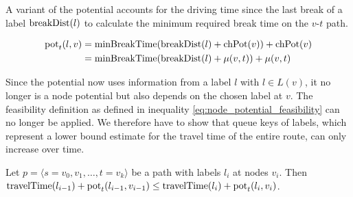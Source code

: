 A variant of the potential accounts for the driving time since the last break of a label $\operatorname{breakDist}(l)$ to calculate the minimum required break time on the $v$-$t$ path.

\begin{align}
	\begin{split}
		\operatorname{pot}_t(l,v) & = \operatorname{minBreakTime}(\operatorname{breakDist}(l) + \operatorname{chPot}(v)) +\operatorname{chPot}(v) \\
		& = \operatorname{minBreakTime}(\operatorname{breakDist}(l) + \mu(v,t)) + \mu(v,t)
	\end{split}
\end{align}

Since the potential now uses information from a label $l$ with $l \in L(v)$, it no longer is a node potential but also depends on the chosen label at $v$. The feasibility definition as defined in inequality \ref{eq:node_potential_feasibility} can no longer be applied. We therefore have to show that queue keys of labels, which represent a lower bound estimate for the travel time of the entire route, can only increase over time.

\begin{lemma}\label{lemma:pot_labels_get_larger}
	Let $p = \langle s=v_0,v_1,\ldots,t=v_k \rangle$ be a path with labels $l_i$ at nodes $v_i$. Then $\operatorname{travelTime}(l_{i-1}) + \operatorname{pot}_t(l_{i-1},v_{i-1}) \le \operatorname{travelTime}(l_i) + \operatorname{pot}_t(l_i,v_i)$.
\end{lemma}

